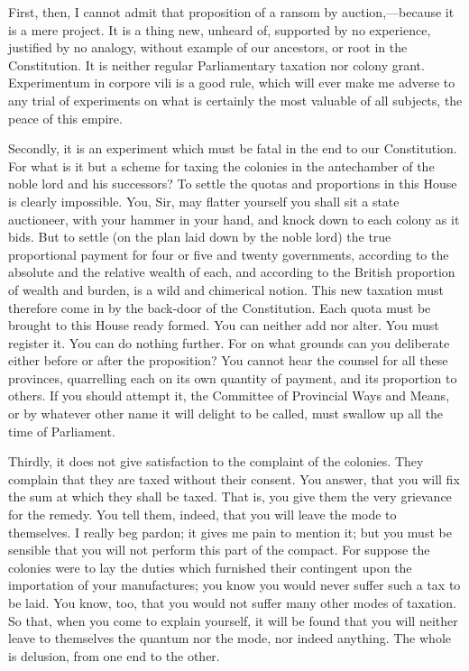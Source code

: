 First, then, I cannot admit that proposition of a ransom by auction,—because it is a mere project. It is a thing new, unheard of, supported by no experience, justified by no analogy, without example of our ancestors, or root in the Constitution. It is neither regular Parliamentary taxation nor colony grant. Experimentum in corpore vili is a good rule, which will ever make me adverse to any trial of experiments on what is certainly the most valuable of all subjects, the peace of this empire.

Secondly, it is an experiment which must be fatal in the end to our Constitution. For what is it but a scheme for taxing the colonies in the antechamber of the noble lord and his successors? To settle the quotas and proportions in this House is clearly impossible. You, Sir, may flatter yourself you shall sit a state auctioneer, with your hammer in your hand, and knock down to each colony as it bids. But to settle (on the plan laid down by the noble lord) the true proportional payment for four or five and twenty governments, according to the absolute and the relative wealth of each, and according to the British proportion of wealth and burden, is a wild and chimerical notion. This new taxation must therefore come in by the back-door of the Constitution. Each quota must be brought to this House ready formed. You can neither add nor alter. You must register it. You can do nothing further. For on what grounds can you deliberate either before or after the proposition? You cannot hear the counsel for all these provinces, quarrelling each on its own quantity of payment, and its proportion to others. If you should attempt it, the Committee of Provincial Ways and Means, or by whatever other name it will delight to be called, must swallow up all the time of Parliament.

Thirdly, it does not give satisfaction to the complaint of the colonies. They complain that they are taxed without their consent. You answer, that you will fix the sum at which they shall be taxed. That is, you give them the very grievance for the remedy. You tell them, indeed, that you will leave the mode to themselves. I really beg pardon; it gives me pain to mention it; but you must be sensible that you will not perform this part of the compact. For suppose the colonies were to lay the duties which furnished their contingent upon the importation of your manufactures; you know you would never suffer such a tax to be laid. You know, too, that you would not suffer many other modes of taxation. So that, when you come to explain yourself, it will be found that you will neither leave to themselves the quantum nor the mode, nor indeed anything. The whole is delusion, from one end to the other.

